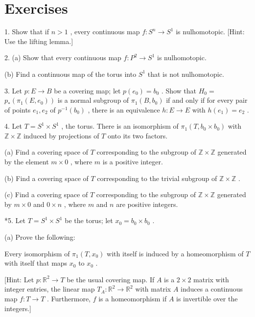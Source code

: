 \section*{Exercises}

1. Show that if \(n > 1\) , every continuous map \(f : {S}^{n} \rightarrow  {S}^{1}\) is nulhomotopic. [Hint: Use the lifting lemma.]

2. (a) Show that every continuous map \(f : {P}^{2} \rightarrow  {S}^{1}\) is nulhomotopic.

(b) Find a continuous map of the torus into \({S}^{1}\) that is not nulhomotopic.

3. Let \(p : E \rightarrow  B\) be a covering map; let \(p\left( {e}_{0}\right)  = {b}_{0}\) . Show that \({H}_{0} =\)  \({p}_{ * }\left( {{\pi }_{1}\left( {E,{e}_{0}}\right) }\right)\) is a normal subgroup of \({\pi }_{1}\left( {B,{b}_{0}}\right)\) if and only if for every pair of points \({e}_{1},{e}_{2}\) of \({p}^{-1}\left( {b}_{0}\right)\) , there is an equivalence \(h : E \rightarrow  E\) with \(h\left( {e}_{1}\right)  = {e}_{2}\) .

4. Let \(T = {S}^{1} \times  {S}^{1}\) , the torus. There is an isomorphism of \({\pi }_{1}\left( {T,{b}_{0} \times  {b}_{0}}\right)\) with \(\mathbb{Z} \times  \mathbb{Z}\) induced by projections of \(T\) onto its two factors.

(a) Find a covering space of \(T\) corresponding to the subgroup of \(\mathbb{Z} \times  \mathbb{Z}\) generated by the element \(m \times  0\) , where \(m\) is a positive integer.

(b) Find a covering space of \(T\) corresponding to the trivial subgroup of \(\mathbb{Z} \times  \mathbb{Z}\) .

(c) Find a covering space of \(T\) corresponding to the subgroup of \(\mathbb{Z} \times  \mathbb{Z}\) generated by \(m \times  0\) and \(0 \times  n\) , where \(m\) and \(n\) are positive integers.

*5. Let \(T = {S}^{1} \times  {S}^{1}\) be the torus; let \({x}_{0} = {b}_{0} \times  {b}_{0}\) .

(a) Prove the following:

\begin{theorem} Every isomorphism of \({\pi }_{1}\left( {T,{x}_{0}}\right)\) with itself is induced by a homeomorphism of \(T\) with itself that maps \({x}_{0}\) to \({x}_{0}\) .
\end{theorem}

[Hint: Let \(p : {\mathbb{R}}^{2} \rightarrow  T\) be the usual covering map. If \(A\) is a \(2 \times  2\) matrix with integer entries, the linear map \({T}_{A} : {\mathbb{R}}^{2} \rightarrow  {\mathbb{R}}^{2}\) with matrix \(A\) induces a continuous map \(f : T \rightarrow  T\) . Furthermore, \(f\) is a homeomorphism if \(A\) is invertible over the integers.]

